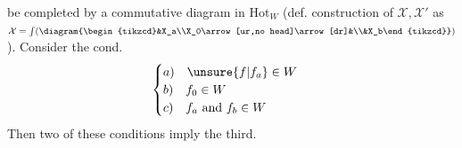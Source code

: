 be completed by a commutative diagram in $\mathrm{Hot}_W$ (def. construction of $\mathcal X,\mathcal X'$ as $\mathcal X=\int(\diagram{\begin{tikzcd}&X_a\\X_0\arrow[ur,no head]\arrow[dr]&\\&X_b\end{tikzcd}})$). Consider the cond.
\[\begin{cases}a)\quad\unsure{f|f_a}\in W\\b)\quad f_0\in W\\c)\quad f_a\text{ and }f_b\in W\end{cases}\]
Then two of these conditions imply the third.
